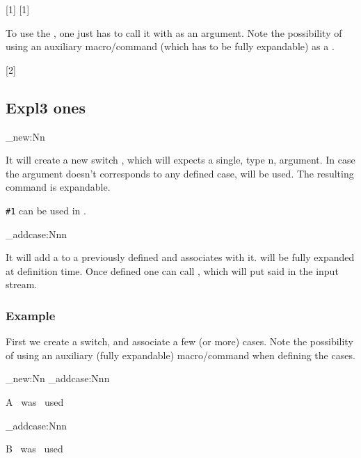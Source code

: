 \documentclass[10pt]{article}
\begin{document}
[1]
[1]

To use the , one just has to call it with  as an argument. Note the possibility of using an auxiliary macro/command (which has to be fully expandable) as a .

[2]



\subsection{Expl3 ones}
\begin{codedescribe}{\switch_new:Nn}
\begin{codesyntax}%
  
\end{codesyntax}
It will create a new switch , which will expects a single, type n, argument. In case the argument doesn't corresponds to any defined case,  will be used. The resulting  command is expandable. 
\end{codedescribe}
\begin{tsremark}
  \verb|#1| can be used in .
\end{tsremark}

\begin{codedescribe}{\switch_addcase:Nnn}
\begin{codesyntax}%
  
\end{codesyntax}
It will add a  to a previously defined  and associates  with it.  will be fully expanded at definition time. Once defined one can call , which will put said  in the input stream. 
\end{codedescribe}


\subsubsection{Example}

First we create a switch, and associate a few (or more) cases. Note the possibility of using an auxiliary (fully expandable) macro/command when defining the cases.
\begin{codestore}[switch01]
\ExplSyntaxOn
\def\CaseAstring{case-A}
\switch_new:Nn 
\switch_addcase:Nnn \TextCase  {\CaseAstring} {A~ was~ used\par}
\switch_addcase:Nnn  {B~ was~ used\par}
\ExplSyntaxOff
\end{codestore}
\end{document}

